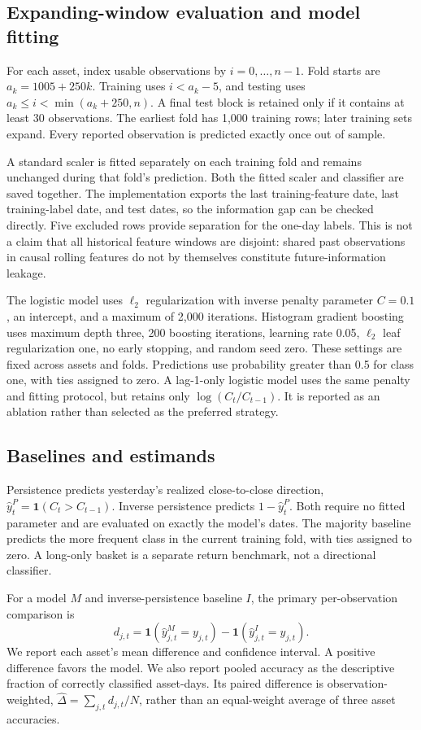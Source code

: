 \documentclass[preprint,12pt,authoryear]{elsarticle}
\newcommand{\ind}{\mathbf{1}}
\begin{document}
\subsection{Expanding-window evaluation and model fitting}
For each asset, index usable observations by $i=0,\ldots,n-1$. Fold starts are $a_k=1005+250k$. Training uses $i<a_k-5$, and testing uses $a_k\leq i<\min(a_k+250,n)$. A final test block is retained only if it contains at least 30 observations. The earliest fold has 1,000 training rows; later training sets expand. Every reported observation is predicted exactly once out of sample.

A standard scaler is fitted separately on each training fold and remains unchanged during that fold's prediction. Both the fitted scaler and classifier are saved together. The implementation exports the last training-feature date, last training-label date, and test dates, so the information gap can be checked directly. Five excluded rows provide separation for the one-day labels. This is not a claim that all historical feature windows are disjoint: shared past observations in causal rolling features do not by themselves constitute future-information leakage.

The logistic model uses $\ell_2$ regularization with inverse penalty parameter $C=0.1$, an intercept, and a maximum of 2,000 iterations. Histogram gradient boosting uses maximum depth three, 200 boosting iterations, learning rate 0.05, $\ell_2$ leaf regularization one, no early stopping, and random seed zero. These settings are fixed across assets and folds. Predictions use probability greater than 0.5 for class one, with ties assigned to zero. A lag-1-only logistic model uses the same penalty and fitting protocol, but retains only $\log(C_t/C_{t-1})$. It is reported as an ablation rather than selected as the preferred strategy.

\subsection{Baselines and estimands}
Persistence predicts yesterday's realized close-to-close direction, $\widehat y_t^{P}=\ind(C_t>C_{t-1})$. Inverse persistence predicts $1-\widehat y_t^P$. Both require no fitted parameter and are evaluated on exactly the model's dates. The majority baseline predicts the more frequent class in the current training fold, with ties assigned to zero. A long-only basket is a separate return benchmark, not a directional classifier.

For a model $M$ and inverse-persistence baseline $I$, the primary per-observation comparison is
\begin{equation}
 d_{j,t}=\ind(\widehat y^M_{j,t}=y_{j,t})-
          \ind(\widehat y^I_{j,t}=y_{j,t}).
\end{equation}
We report each asset's mean difference and confidence interval. A positive difference favors the model. We also report pooled accuracy as the descriptive fraction of correctly classified asset-days. Its paired difference is observation-weighted, $\widehat\Delta=\sum_{j,t}d_{j,t}/N$, rather than an equal-weight average of three asset accuracies.
\end{document}
